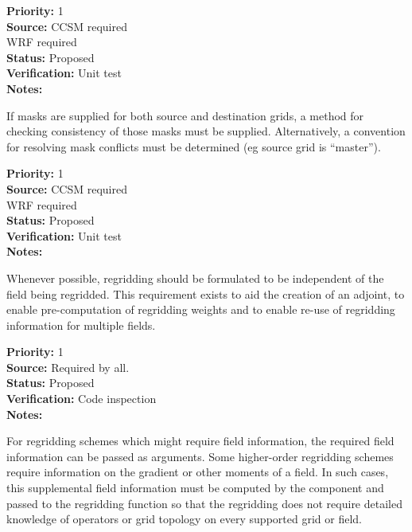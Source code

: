 \begin{reqlist}
{\bf Priority:} 1 \\
{\bf Source:} CCSM required \\
              WRF required \\
{\bf Status:} Proposed \\
{\bf Verification:} Unit test \\
{\bf Notes:} 
\end{reqlist}


If masks are supplied for both source and destination grids, a
method for checking consistency of those masks must be supplied.
Alternatively, a convention for resolving mask conflicts must
be determined (eg source grid is ``master'').

\begin{reqlist}
{\bf Priority:} 1 \\
{\bf Source:} CCSM required \\
              WRF required \\
{\bf Status:} Proposed \\
{\bf Verification:} Unit test \\
{\bf Notes:} 
\end{reqlist}


Whenever possible, regridding should be formulated to be
independent of the field being regridded.  This requirement exists to
aid the creation of an adjoint, to enable pre-computation of regridding
weights and to enable re-use of regridding information for multiple
fields.

\begin{reqlist}
{\bf Priority:} 1 \\
{\bf Source:} Required by all. \\
{\bf Status:} Proposed \\
{\bf Verification:} Code inspection  \\
{\bf Notes:} 
\end{reqlist}


For regridding schemes which might require field information,
the required field information can be passed as arguments.
Some higher-order regridding schemes require information on the
gradient or other moments of a field.  In such cases, this 
supplemental field information must be computed by the component 
and passed to the regridding function so that the regridding does 
not require detailed knowledge of operators or grid topology on every
supported grid or field.

